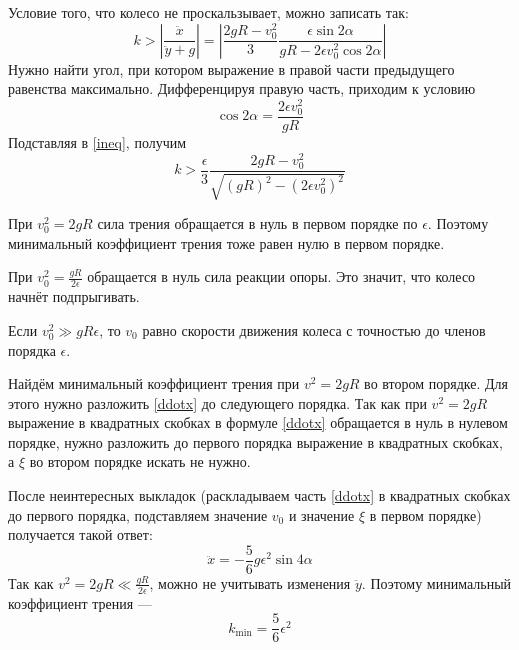 \documentclass{article}
\begin{document}
	Условие того, что колесо не проскальзывает, можно записать так:
	\begin{equation}
		\label{ineq}
		k > \left|\frac{\ddot{x}}{\ddot{y} + g}\right| = 
		\left| \frac{2gR - v_0^2}{3}
		\frac{\epsilon\sin{2\alpha}}{gR - 2\epsilon v_0^2\cos{2\alpha}}\right|
	\end{equation}
	Нужно найти угол, при котором выражение 
	в правой части предыдущего равенства максимально.
	Дифференцируя правую часть, приходим к условию
	\begin{equation}
		\cos{2\alpha} = \frac{2\epsilon v_0^2}{gR}
	\end{equation}
	Подставляя в \ref{ineq}, получим
	\begin{equation}
		k > \frac{\epsilon}{3} 
			\frac{2gR - v_0^2}{\sqrt{(gR)^2 - (2\epsilon v_0^2)^2}}
	\end{equation}

	При $v_0^2 = 2gR$ сила трения обращается в нуль в первом порядке по $\epsilon$.
	Поэтому минимальный коэффициент трения тоже равен нулю в первом порядке.
	
	При $v_0^2 = \frac{gR}{2\epsilon}$ обращается в нуль сила реакции опоры. Это значит, что 
	колесо начнёт подпрыгивать.
	
	Если $v_0^2 \gg gR\epsilon$, то $v_0$ равно скорости движения колеса с точностью
	до членов порядка $\epsilon$. 

	Найдём минимальный коэффициент трения при $v^2 = 2gR$ во втором порядке.
	Для этого нужно разложить \ref{ddotx} до следующего порядка. Так как при $v^2 = 2gR$ 
	выражение в квадратных скобках в формуле \ref{ddotx} обращается в нуль в нулевом порядке,
	нужно разложить до первого порядка выражение в квадратных скобках,
	а $\xi$ во втором порядке 	искать не нужно. 
	
	После неинтересных выкладок (раскладываем часть \ref{ddotx} в квадратных скобках 
	до первого порядка, подставляем значение $v_0$ и значение $\xi$ в первом порядке) 
	получается такой ответ:
	\begin{equation}
		\ddot{x} = -\frac{5}{6} g\epsilon^2 \sin{4\alpha}
	\end{equation}
	Так как $v^2 = 2gR \ll \frac{gR}{2\epsilon}$, можно не учитывать изменения $\ddot{y}$.
	Поэтому минимальный коэффициент трения ---
	\begin{equation}
		k_{\mathrm{min}} = \frac{5}{6}\epsilon^2
	\end{equation}
		
\end{document}
